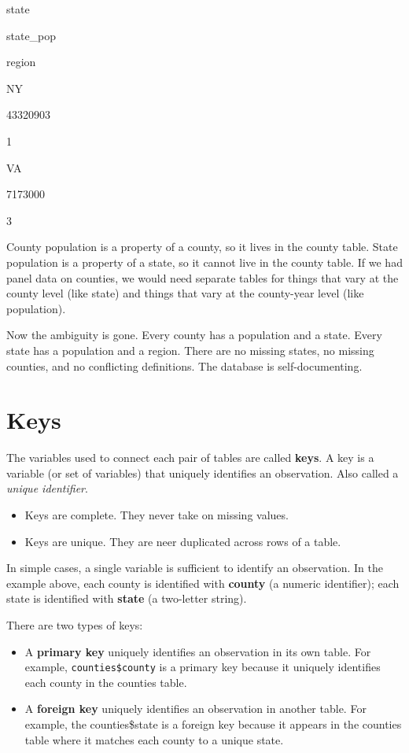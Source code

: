 \documentclass[]{book}
\providecommand{\tightlist}{%
  \setlength{\itemsep}{0pt}\setlength{\parskip}{0pt}}
\begin{document}
state

state\_pop

region

NY

43320903

1

VA

7173000

3

County population is a property of a county, so it lives in the county
table. State population is a property of a state, so it cannot live in
the county table. If we had panel data on counties, we would need
separate tables for things that vary at the county level (like state)
and things that vary at the county-year level (like population).

Now the ambiguity is gone. Every county has a population and a state.
Every state has a population and a region. There are no missing states,
no missing counties, and no conflicting definitions. The database is
self-documenting.

\section{Keys}\label{keys}

The variables used to connect each pair of tables are called
\textbf{keys}. A key is a variable (or set of variables) that uniquely
identifies an observation. Also called a \emph{unique identifier}.

\begin{itemize}
\tightlist
\item
  Keys are complete. They never take on missing values.
\item
  Keys are unique. They are neer duplicated across rows of a table.
\end{itemize}

In simple cases, a single variable is sufficient to identify an
observation. In the example above, each county is identified with
\textbf{county} (a numeric identifier); each state is identified with
\textbf{state} (a two-letter string).

There are two types of keys:

\begin{itemize}
\item
  A \textbf{primary key} uniquely identifies an observation in its own
  table. For example, \texttt{counties\$county} is a primary key because
  it uniquely identifies each county in the counties table.
\item
  A \textbf{foreign key} uniquely identifies an observation in another
  table. For example, the counties\$state is a foreign key because it
  appears in the counties table where it matches each county to a unique
  state.
\end{itemize}
\end{document}
